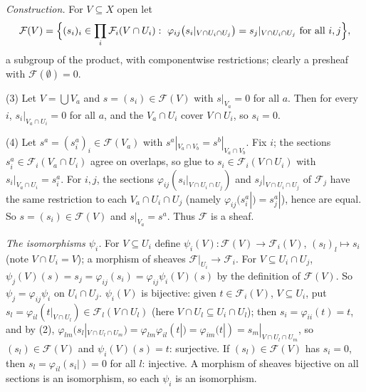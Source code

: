 \documentclass[11pt]{article}
\begin{document}
\emph{Construction.} For $V\subseteq X$ open let
\[
\mathcal F(V)=\Bigl\{(s_i)_i\in\prod_i\mathcal F_i(V\cap U_i):\ \varphi_{ij}\bigl(s_i|_{V\cap U_i\cap U_j}\bigr)=s_j|_{V\cap U_i\cap U_j}\ \text{for all }i,j\Bigr\},
\]
a subgroup of the product, with componentwise restrictions; clearly a presheaf with $\mathcal F(\emptyset)=0$.

(3) Let $V=\bigcup V_a$ and $s=(s_i)\in\mathcal F(V)$ with $s|_{V_a}=0$ for all $a$. Then for every $i$, $s_i|_{V_a\cap U_i}=0$ for all $a$, and the $V_a\cap U_i$ cover $V\cap U_i$, so $s_i=0$.

(4) Let $s^a=(s^a_i)_i\in\mathcal F(V_a)$ with $s^a|_{V_a\cap V_b}=s^b|_{V_a\cap V_b}$. Fix $i$; the sections $s^a_i\in\mathcal F_i(V_a\cap U_i)$ agree on overlaps, so glue to $s_i\in\mathcal F_i(V\cap U_i)$ with $s_i|_{V_a\cap U_i}=s^a_i$. For $i,j$, the sections $\varphi_{ij}(s_i|_{V\cap U_i\cap U_j})$ and $s_j|_{V\cap U_i\cap U_j}$ of $\mathcal F_j$ have the same restriction to each $V_a\cap U_i\cap U_j$ (namely $\varphi_{ij}(s^a_i|)=s^a_j|$), hence are equal. So $s=(s_i)\in\mathcal F(V)$ and $s|_{V_a}=s^a$. Thus $\mathcal F$ is a sheaf.

\emph{The isomorphisms $\psi_i$.} For $V\subseteq U_i$ define $\psi_i(V)\colon\mathcal F(V)\to\mathcal F_i(V)$, $(s_l)_l\mapsto s_i$ (note $V\cap U_i=V$); a morphism of sheaves $\mathcal F|_{U_i}\to\mathcal F_i$. For $V\subseteq U_i\cap U_j$, $\psi_j(V)(s)=s_j=\varphi_{ij}(s_i)=\varphi_{ij}\psi_i(V)(s)$ by the definition of $\mathcal F(V)$. So $\psi_j=\varphi_{ij}\psi_i$ on $U_i\cap U_j$. $\psi_i(V)$ is bijective: given $t\in\mathcal F_i(V)$, $V\subseteq U_i$, put $s_l=\varphi_{il}(t|_{V\cap U_l})\in\mathcal F_l(V\cap U_l)$ (here $V\cap U_l\subseteq U_i\cap U_l$); then $s_i=\varphi_{ii}(t)=t$, and by (2), $\varphi_{lm}(s_l|_{V\cap U_l\cap U_m})=\varphi_{lm}\varphi_{il}(t|)=\varphi_{im}(t|)=s_m|_{V\cap U_l\cap U_m}$, so $(s_l)\in\mathcal F(V)$ and $\psi_i(V)(s)=t$: surjective. If $(s_l)\in\mathcal F(V)$ has $s_i=0$, then $s_l=\varphi_{il}(s_i|)=0$ for all $l$: injective. A morphism of sheaves bijective on all sections is an isomorphism, so each $\psi_i$ is an isomorphism.
\end{document}
